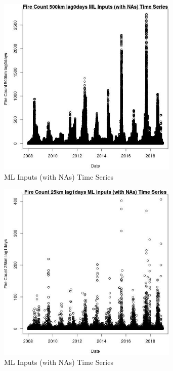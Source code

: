 \begin{figure} 
\centering  
\includegraphics[width=0.77\textwidth]{Code_Outputs/Report_ML_input_PM25_Step4_part_f_de_duplicated_aves_prioritize_24hr_obswNAs_Fire_Count_500km_lag0daysvDate.jpg} 
\caption{\label{fig:Report_ML_input_PM25_Step4_part_f_de_duplicated_aves_prioritize_24hr_obswNAsFire_Count_500km_lag0daysvDate}ML Inputs (with NAs) Time Series} 
\end{figure} 
 

\begin{figure} 
\centering  
\includegraphics[width=0.77\textwidth]{Code_Outputs/Report_ML_input_PM25_Step4_part_f_de_duplicated_aves_prioritize_24hr_obswNAs_Fire_Count_25km_lag1daysvDate.jpg} 
\caption{\label{fig:Report_ML_input_PM25_Step4_part_f_de_duplicated_aves_prioritize_24hr_obswNAsFire_Count_25km_lag1daysvDate}ML Inputs (with NAs) Time Series} 
\end{figure} 
 


